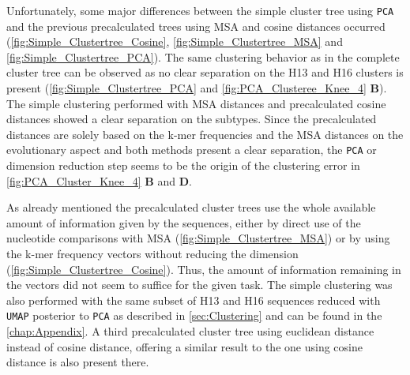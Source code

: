 Unfortunately, some major differences between the simple cluster tree using \texttt{PCA} and the previous precalculated trees using \gls{MSA} and cosine distances occurred (\autoref{fig:Simple_Clustertree_Cosine}, \autoref{fig:Simple_Clustertree_MSA} and \autoref{fig:Simple_Clustertree_PCA}). The same clustering behavior as in the complete cluster tree can be observed as no clear separation on the H13 and H16 clusters is present (\autoref{fig:Simple_Clustertree_PCA} and \autoref{fig:PCA_Clusteree_Knee_4} \textbf{\textsf{B}}). The simple clustering performed with \gls{MSA} distances and precalculated cosine distances showed a clear separation on the subtypes. Since the precalculated distances are solely based on the k-mer frequencies and the \gls{MSA} distances on the evolutionary aspect and both methods present a clear separation, the \texttt{PCA} or dimension reduction step seems to be the origin of the clustering error in \autoref{fig:PCA_Cluster_Knee_4} \textbf{\textsf{B}} and \textbf{\textsf{D}}. 

As already mentioned the precalculated cluster trees use the whole available amount of information given by the sequences, either by direct use of the nucleotide comparisons with \gls{MSA} (\autoref{fig:Simple_Clustertree_MSA}) or by using the k-mer frequency vectors without reducing the dimension (\autoref{fig:Simple_Clustertree_Cosine}). Thus, the amount of information remaining in the vectors did not seem to suffice for the given task. The simple clustering was also performed with the same subset of H13 and H16 sequences reduced with \texttt{UMAP} posterior to \texttt{PCA} as described in \autoref{sec:Clustering} and can be found in the \autoref{chap:Appendix}. A third precalculated cluster tree using euclidean distance instead of cosine distance, offering a similar result to the one using cosine distance is also present there.